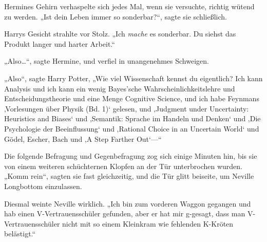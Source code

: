 Hermines Gehirn verhaspelte sich jedes Mal, wenn sie versuchte, richtig wütend zu werden. „Ist dein Leben immer so sonderbar?“, sagte sie schließlich.

Harrys Gesicht strahlte vor Stolz. „Ich \emph{mache} es sonderbar. Du siehst das Produkt langer und harter Arbeit.“

„Also…“, sagte Hermine, und verfiel in unangenehmes Schweigen.

„Also“, sagte Harry Potter, „Wie viel Wissenschaft kennst du eigentlich? Ich kann Analysis und ich kann ein wenig Bayes’sche Wahrscheinlichkeitslehre und Entscheidungstheorie und eine Menge Cognitive Science, und ich habe Feynmans ‚Vorlesungen über Physik (Bd. 1)‘ gelesen, und ‚Judgment under Uncertainty: Heuristics and Biases‘ und ‚Semantik: Sprache im Handeln und Denken‘ und ‚Die Psychologie der Beeinflussung‘ und ‚Rational Choice in an Uncertain World‘ und Gödel, Escher, Bach und ‚A Step Farther Out‘—“

Die folgende Befragung und Gegenbefragung zog sich einige Minuten hin, bis sie von einem weiteren schüchternen Klopfen an der Tür unterbrochen wurden. „Komm rein“, sagten sie fast gleichzeitig, und die Tür glitt beiseite, um Neville Longbottom einzulassen.

Diesmal weinte Neville wirklich. „Ich bin zum vorderen Waggon gegangen und hab einen V-Vertrauensschüler gefunden, aber er hat mir g-gesagt, dass man V-Vertrauensschüler nicht mit so einem Kleinkram wie fehlenden K-Kröten belästigt.“

